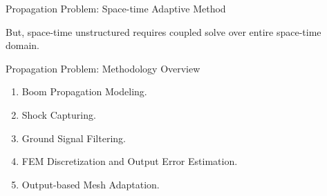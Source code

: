 \documentclass{beamer}
\newcounter{sectionframecount}
\begin{document}

\begin{frame}[t]{Propagation Problem: Space-time Adaptive Method}


\begin{minipage}[t]{1\linewidth}
  \vspace{4.8cm}
  But, space-time unstructured requires coupled solve over entire space-time domain.
\end{minipage}

\end{frame}


\begin{frame}[t]{Propagation Problem: Methodology Overview}
  \vspace{20pt}
  \begin{minipage}[t]{1\linewidth}
    \begin{enumerate}
      \item Boom Propagation Modeling.
      \vspace{10pt}
      \item Shock Capturing.
      \vspace{10pt}
      \item Ground Signal Filtering.
      \vspace{10pt}
      \item FEM Discretization and Output Error Estimation.
      \vspace{10pt}
      \item Output-based Mesh Adaptation.
    \end{enumerate}

  \end{minipage}
\end{frame}
\end{document}

